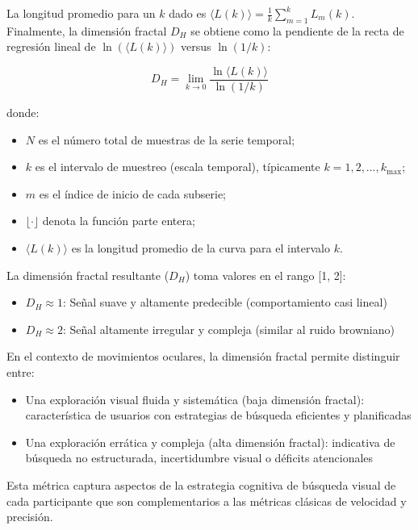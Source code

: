 La longitud promedio para un $k$ dado es $\langle L(k) \rangle = \frac{1}{k} \sum_{m=1}^{k} L_m(k)$. Finalmente, la dimensión fractal $D_H$ se obtiene como la pendiente de la recta de regresión lineal de $\ln(\langle L(k) \rangle)$ versus $\ln(1/k)$:

\begin{equation}
	D_H = \lim_{k \to 0} \frac{\ln \langle L(k) \rangle}{\ln(1/k)} \tag{8}
\end{equation}

donde:
\begin{itemize}
	\item $N$ es el número total de muestras de la serie temporal;
	\item $k$ es el intervalo de muestreo (escala temporal), típicamente $k = 1, 2, \dots, k_{\max}$;
	\item $m$ es el índice de inicio de cada subserie;
	\item $\lfloor \cdot \rfloor$ denota la función parte entera;
	\item $\langle L(k) \rangle$ es la longitud promedio de la curva para el intervalo $k$.
\end{itemize}

La dimensión fractal resultante ($D_H$) toma valores en el rango [1, 2]:
\begin{itemize}
	\item $D_H \approx 1$: Señal suave y altamente predecible (comportamiento casi lineal)
	\item $D_H \approx 2$: Señal altamente irregular y compleja (similar al ruido browniano)
\end{itemize}

En el contexto de movimientos oculares, la dimensión fractal permite distinguir entre:
\begin{itemize}
	\item Una exploración visual fluida y sistemática (baja dimensión fractal): característica de usuarios con estrategias de búsqueda eficientes y planificadas
	\item Una exploración errática y compleja (alta dimensión fractal): indicativa de búsqueda no estructurada, incertidumbre visual o déficits atencionales
\end{itemize}

Esta métrica captura aspectos de la estrategia cognitiva de búsqueda visual de cada participante que son complementarios a las métricas clásicas de velocidad y precisión.

